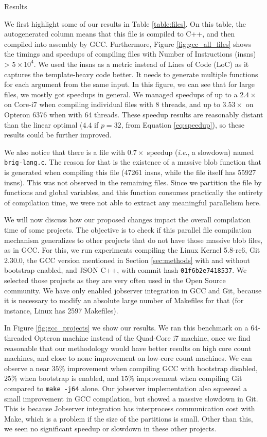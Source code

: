 \begin{subsection}{Results}\label{sec:lto-results}

We first highlight some of our results in Table \ref{table:files}. On this
table, the autogenerated column means that this file is compiled to C++, and
then compiled into assembly by GCC. Furthermore, Figure
\ref{fig:gcc_all_files} shows the timings and speedups of compiling files with
Number of Instructions (insns) > $5\times 10^4$. We used the insns as a metric
instead of Lines of Code (LoC) as it captures the template-heavy code better. It needs to
generate multiple functions for each argument from
the same input. In this figure, we can see that for large files, we mostly got
speedups in general. We managed speedups of up to a $2.4\times$ on Core-i7 when
compiling individual files with 8 threads, and up to $3.53\times$ on Opteron
6376 when with 64 threads. These speedup results are reasonably distant than
the linear optimal ($4.4$ if $p = 32$, from Equation \ref{eq:speedup}), so these results could be further improved.

We also notice that there is a file with $0.7\times$ speedup (\textit{i.e}., a
slowdown) named \texttt{brig-lang.c}. The reason for that is the existence of a
massive blob function that is generated when compiling this file (47261 insns,
while the file itself has 55927 insns).  This was not observed in the remaining
files. Since we partition the file by functions and global variables, and this
function consumes practically the entirety of compilation time, we were not
able to extract any meaningful parallelism here.


We will now discuss how our proposed changes impact the overall compilation
time of some projects. The objective is to check if this parallel file
compilation mechanism generalizes to other projects that do not have those
massive blob files, as in GCC.  For this, we run experiments compiling the
Linux Kernel 5.8-rc6, Git 2.30.0, the GCC version mentioned in Section
\ref{sec:methods} with and without bootstrap enabled, and JSON C++, with commit
hash \texttt{01f6b2e7418537}. We selected those projects as they are very often
used in the Open Source community.  We have only enabled jobserver integration
in GCC and Git, because it is necessary to modify an absolute large number of
Makefiles for that (for instance, Linux has 2597 Makefiles).

In Figure \ref{fig:gcc_projects} we show our results. We ran this benchmark on a
64-threaded Opteron machine instead of the Quad-Core i7 machine, once we find
reasonable that our methodology would have better results on high core count
machines, and close to none improvement on low-core count machines.  We can
observe a near $35\%$ improvement when compiling GCC with bootstrap disabled,
$25\%$ when bootstrap is enabled, and $15\%$ improvement when compiling Git
compared to \texttt{make -j64} alone. Our jobserver implementation also
squeezed a small improvement in GCC compilation, but showed a massive slowdown
in Git. This is because Jobserver integration has interprocess communication
cost with Make, which is a problem if the size of the partitions is small.
Other than this, we seen no significant speedup or slowdown in these
other projects.


\end{subsection}
